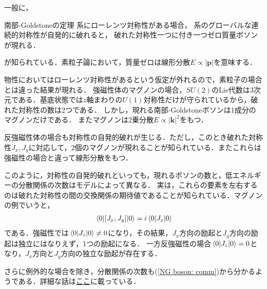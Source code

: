 \documentclass[dvipdfmx,9pt]{beamer}
\numberwithin{equation}{section}
\begin{document}
\begin{frame}
    一般に，
    \begin{block}{南部-Goldstoneの定理}
        系にローレンツ対称性がある場合，
        系のグローバルな連続的対称性が自発的に破れると，
        破れた対称性一つに付き一つゼロ質量ボソンが現れる．
    \end{block}
    が知られている．素粒子論において，質量ゼロは線形分散$E \propto |\bm{p}|$を意味する．

    物性においてはローレンツ対称性があるという仮定が外れるので，素粒子の場合とは違った結果が現れる．
    強磁性体のマグノンの場合，$SU(2)$のLie代数は$3$次元である．基底状態では$z$軸まわりの$U(1)$対称性だけが守られているから，破れた対称性の数は2つである．
    しかし，現れる南部-Goldstoneボソンは1成分のマグノンだけである．
    またマグノンは2乗分散$E \propto |\bm{k}|^2$をもつ．
\end{frame}

\begin{frame}
    反強磁性体の場合も対称性の自発的破れが生じる．ただし，このとき破れた対称性$J_x, J_y$に対応して，\alert{2個}のマグノンが現れることが知られている．またこれらは強磁性の場合と違って\alert{線形分散}をもつ．

    このように，対称性の自発的破れといっても，現れるボソンの数と，低エネルギーの分散関係の次数はモデルによって異なる．
    実は，これらの要素を左右するのは破れた対称性の間の交換関係の期待値であることが知られている．マグノンの例でいうと，
    \begin{align}
        \mel{0}{[J_x, J_y]}{0} = i \mel{0}{J_z}{0}
        \label{NG boson: comm}
    \end{align}
    である．強磁性では$\mel{0}{J_z}{0} \ne 0$になり，その結果，$J_x$方向の励起と$J_y$方向の励起は独立にはなりえず，1つの励起になる．
    一方反強磁性の場合$\mel{0}{J_z}{0} = 0$となり，$J_x$方向と$J_y$方向の独立な励起が存在する．

    さらに例外的な場合を除き，分散関係の次数も(\ref{NG boson: comm})から分かるようである．詳細な話は\href{https://www.jstage.jst.go.jp/article/butsuri/68/4/68_KJ00008636350/_article/-char/ja/}{ここ}に載っている．
\end{frame}
\end{document}
